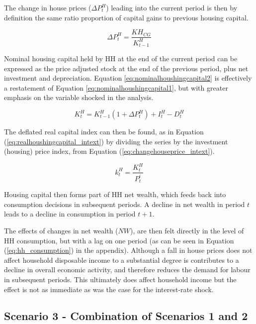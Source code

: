\documentclass[
]{book}
\begin{document}
The change in house prices (\(\Delta P^H_t\)) leading into the current period is then by definition the same ratio proportion of capital gains to previous housing capital.

\begin{equation}
\Delta P^H_t = \frac{KH_{CG}}{K^H_{t-1}}
\label{eq:changehouseprice_intext}
\end{equation}

Nominal housing capital held by HH at the end of the current period
can be expressed as the price adjusted stock at the end of the previous
period, plus net investment and depreciation. Equation \ref{eq:nominalhoushingcapital2}
is effectively a restatement of Equation \ref{eq:nominalhoushingcapital1}, but
with greater emphasis on the variable shocked in the analysis.

\begin{equation}
K^H_t = K^H_{t-1}(1 + \Delta P^H_t) + I^H_t- D^H_t
\label{eq:nominalhoushingcapital2}
\end{equation}

The deflated real capital index can then be found, as in Equation (\ref{eq:realhoushingcapital_intext}) by dividing the series by the investment (housing) price index, from Equation (\ref{eq:changehouseprice_intext}).

\begin{equation}
k^H_t = \frac{K^H_t}{P^i_t}
\label{eq:realhoushingcapital_intext}
\end{equation}

Housing capital then forms part of HH net wealth, which feeds back into consumption decisions in subsequent periods. A decline in net wealth in period \(t\) leads to a decline in consumption in period \(t+1\).

The effects of changes in net wealth (\(NW\)), are then felt directly in the level of HH consumption, but with a lag on one period (as can be seen in Equation (\ref{eq:hh_consumption}) in the appendix). Although a fall in house prices does not affect household disposable income to a substantial degree is contributes to a decline in overall economic activity, and therefore reduces the demand for labour in subsequent periods. This ultimately does affect household income but the effect is not as immediate as was the case for the interest-rate shock.

\hypertarget{sec:fi-fl-sfc-scenarios-s3}{%
\subsection{Scenario 3 - Combination of Scenarios 1 and 2}\label{sec:fi-fl-sfc-scenarios-s3}}
\end{document}
